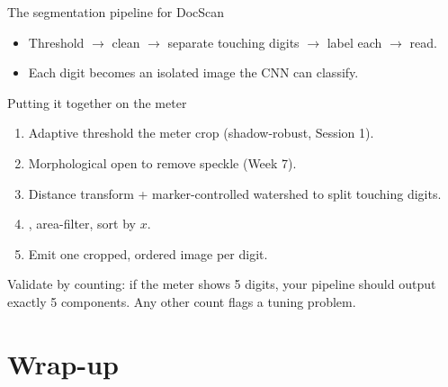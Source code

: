 \documentclass[10pt,aspectratio=169]{beamer}
\begin{document}
\begin{frame}{The segmentation pipeline for DocScan}
  \begin{center}
  \end{center}
  \begin{itemize}
    \item Threshold $\rightarrow$ clean $\rightarrow$ separate touching digits $\rightarrow$ label each $\rightarrow$ read.
    \item Each digit becomes an isolated image the CNN can classify.
  \end{itemize}
\end{frame}

\begin{frame}{Putting it together on the meter}
  \begin{enumerate}
    \item Adaptive threshold the meter crop (shadow-robust, Session 1).
    \item Morphological open to remove speckle (Week 7).
    \item Distance transform + marker-controlled watershed to split touching digits.
    \item {}, area-filter, sort by $x$.
    \item Emit one cropped, ordered image per digit.
  \end{enumerate}
  \begin{goodbox}
    Validate by counting: if the meter shows 5 digits, your pipeline should output exactly
    5 components. Any other count flags a tuning problem.
  \end{goodbox}
\end{frame}

\section{Wrap-up}
\end{document}
